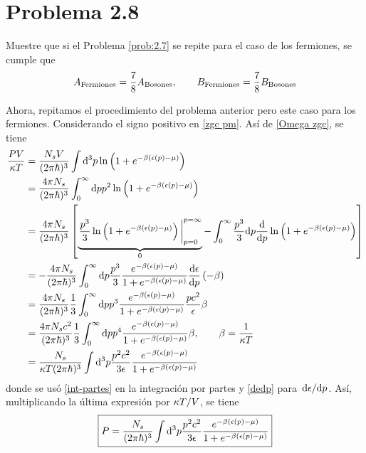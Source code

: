 \section{Problema 2.8}\label{prob:2.8}
\begin{tcolorbox}
\begin{problema}
	Muestre que si el Problema \ref{prob:2.7} se repite para el caso de los fermiones, se cumple que
	\begin{equation}
  A_{\rm Fermiones}=\frac{7}{8}A_{\rm Bosones},\qquad B_{\rm Fermiones}=\frac{7}{8}B_{\rm Bosones}
\end{equation}
\end{problema}
\end{tcolorbox}

\begin{sol}
	Ahora, repitamos el procedimiento del problema anterior pero este caso para los fermiones. Considerando el signo positivo en \eqref{zgc pm}. Así de \eqref{Omega zgc}, se tiene
  \begin{align}
  \frac{PV}{\k T}&=\frac{N_sV}{(2\p\hbar)^3}\int\dd^3p\ln\left(1+e^{-\b(\epsilon(p)-\m )}\right)\\
  &=\frac{4\p N_s}{(2\p\hbar)^3}\int_0^\infty \dd p p ^2\ln\left(1+e^{-\b(\epsilon(p)-\m )}\right)\\
  &=\frac{4\p N_s}{(2\p\hbar)^3}\left[\underbrace{\eval{\frac{p^3}{3}\ln\left(1+e^{-\b(\epsilon(p)-\m )}\right)}_{p=0}^{p=\infty}}_{0} -\int_0^\infty \frac{p^3}{3}\dd p\dv{p}\ln\left(1+e^{-\b(\epsilon(p)-\m )}\right)\right]\\
  &=-\frac{4\p N_s}{(2\p\hbar)^3}\int_0^\infty \dd p\frac{p^3}{3}\frac{e^{-\b(\epsilon(p)-\m )}}{1+e^{-\b(\epsilon(p)-\m )}}\dv{\epsilon}{p}\left(-\b \right)\\
  &=\frac{4\p N_s}{(2\p\hbar)^3}\frac{1}{3}\int_0^\infty\dd pp^3\frac{e^{-\b(\epsilon(p)-\m )}}{1+e^{-\b(\epsilon(p)-\m )}}\frac{pc^2}{\epsilon}\b \\
  &=\frac{4\p N_sc^2}{(2\p\hbar)^3}\frac{1}{3}\int_0^\infty \dd pp^4\frac{e^{-\b(\epsilon(p)-\m )}}{1+e^{-\b(\epsilon(p)-\m )}}\b ,\qquad \b=\frac{1}{\k T}\\
  &=\frac{N_s}{\k T(2\p\hbar)^3}\int\dd^3p\frac{p^2c^2}{3\epsilon}\frac{e^{-\b(\epsilon(p)-\m )}}{1+e^{-\b(\epsilon(p)-\m )}}
\end{align}
donde se usó \eqref{int-partes} en la integración por partes y \eqref{dedp} para $\dv*{\epsilon}{p}$. Así, multiplicando la última expresión por $\kappa T/V$, se tiene
\begin{equation}
  \boxed{P=\frac{N_s}{(2\p\hbar)^3}\int\dd^3p\frac{p^2c^2}{3\epsilon}\frac{e^{-\b (\epsilon(p)-\m )}}{1+e^{-\b (\epsilon(p)-\m )}}}

\end{equation}
\end{sol}

